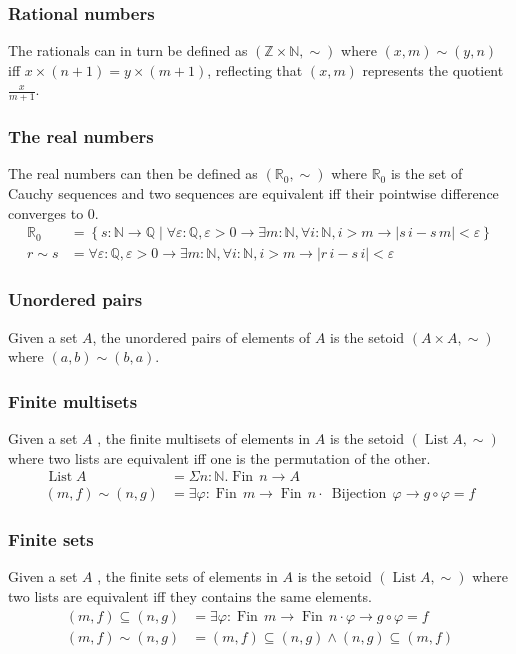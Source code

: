 \documentclass[envcountsame]{llncs}
\newcommand{\N}{\mathbb{N}}
\newcommand{\Q}{\mathbb{Q}}
\newcommand{\R}{\mathbb{R}}
\newcommand{\Z}{\mathbb{Z}}
\providecommand{\set}  [1]{\left\{#1\right\}}
\DeclareMathOperator{\List}{List}
\DeclareMathOperator{\Fin}{Fin}
\begin{document}
\subsubsection*{Rational numbers}
The rationals can in turn be defined as $(\Z\times\N,\sim)$ where $(x,m)\sim(y,n)$ if{f} $x\times(n+1)=y\times(m+1)$, reflecting that $(x,m)$ represents the quotient $\frac {x}{m+1}$.


\subsubsection*{The real numbers}

The real numbers can then be defined as $(\R_0,\sim)$ where $\R_0$ is the set of Cauchy sequences and two sequences are equivalent if{f} their pointwise difference converges to $0$. 
\begin{align*}
\R_0&=\set{s : \N\to\Q \mid \forall\varepsilon :\Q,\varepsilon>0\to\exists m:\N, \forall i:\N, i>m\to |s\,i - s\, m|<\varepsilon}\\
r\sim s &= \forall\varepsilon :\Q,\varepsilon>0\to\exists m:\N, \forall i:\N, i>m\to |r\,i - s\,i|<\varepsilon
\end{align*}

\subsubsection*{Unordered pairs}
Given a set $A$, the unordered pairs of elements of $A$ is the setoid $(A\times A,\sim)$ where
$(a,b)\sim(b,a)$.

\subsubsection*{Finite multisets}
Given a set $A$ , the finite multisets of elements in $A$ is the setoid $(\List A,\sim)$ where two lists are equivalent if{f} one is the permutation of the other.
\begin{align*}
\List A &= \Sigma n:\N.\Fin\,n\to A\\
(m,f)\sim(n,g) &= \exists \varphi : \Fin\,m \to \Fin\,n \cdot\ \mathop{Bijection}\,\varphi \to g\circ\varphi = f  
\end{align*}

\subsubsection*{Finite sets}
Given a set $A$ , the finite sets of elements in $A$ is the setoid $(\List A,\sim)$ where two lists are equivalent if{f} they contains the same elements.
\begin{align*}
(m,f)\subseteq(n,g) &= \exists \varphi : \Fin\,m \to \Fin\,n \cdot \varphi \to g\circ\varphi = f  \\
(m,f)\sim(n,g)&= (m,f)\subseteq(n,g) \wedge (n,g)\subseteq(m,f)
\end{align*}
\end{document}
